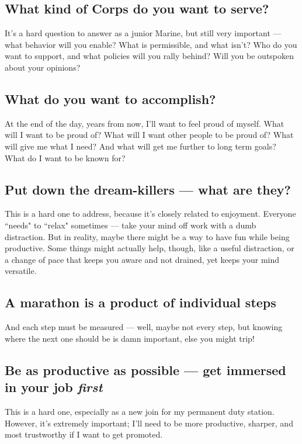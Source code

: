 \subsection{What kind of Corps do you want to serve?}

It's a hard question to answer as a junior Marine, but still very important ---
what behavior will you enable? What is permissible, and what isn't? Who do
you want to support, and what policies will you rally behind? Will you
be outspoken about your opinions?

\subsection{What do you want to accomplish?}

At the end of the day, years from now, I'll want to feel proud of myself.
What will I want to be proud of? What will I want other people to be proud
of? What will give me what I need? And what will get me further to long term
goals? What do I want to be known for?

\subsection{Put down the dream-killers --- what are they?}

This is a hard one to address, because it's closely related to enjoyment.
Everyone ``needs" to ``relax" sometimes --- take your mind off work with
a dumb distraction. But in reality, maybe there might be a way to have
fun while being productive. Some things might actually help, though,
like a useful distraction, or a change of pace that keeps you aware
and not drained, yet keeps your mind versatile.

\subsection{A marathon is a product of individual steps}

And each step must be measured --- well, maybe not every step, but
knowing where the next one should be is damn important, else you might trip!

\subsection{Be as productive as possible --- get immersed in your job \textit{first}}

This is a hard one, especially as a new join for my permanent duty station.
However, it's extremely important; I'll need to be more productive, sharper,
and most trustworthy if I want to get promoted.


